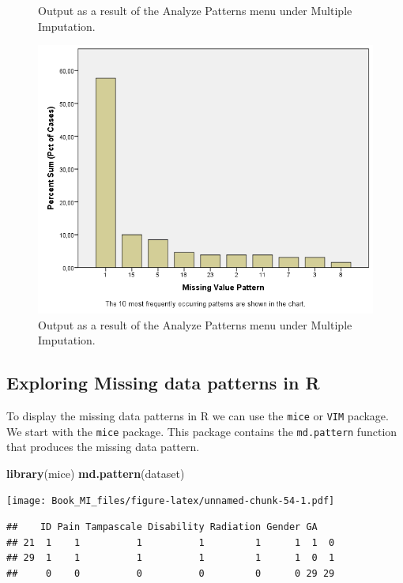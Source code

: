 \documentclass[]{book}
\newenvironment{Shaded}{\begin{snugshade}}{\end{snugshade}}
\newcommand{\KeywordTok}[1]{\textcolor[rgb]{0.13,0.29,0.53}{\textbf{#1}}}
\newcommand{\NormalTok}[1]{#1}
\begin{document}
\begin{figure}
{}

\caption{Output as a result of the Analyze Patterns menu under Multiple Imputation.}\label{fig:fig2-6}
\end{figure}\begin{figure}

{\centering \includegraphics[width=0.9\linewidth]{images/fig2.6d} 

}

\caption{Output as a result of the Analyze Patterns menu under Multiple Imputation.}\label{fig:fig2-6}
\end{figure}

\subsection{Exploring Missing data patterns in
R}\label{exploring-missing-data-patterns-in-r}

To display the missing data patterns in R we can use the \texttt{mice}
or \texttt{VIM} package. We start with the \texttt{mice} package. This
package contains the \texttt{md.pattern} function that produces the
missing data pattern.

\begin{Shaded}
\begin{Highlighting}[]
\KeywordTok{library}\NormalTok{(mice)}
\KeywordTok{md.pattern}\NormalTok{(dataset)}
\end{Highlighting}
\end{Shaded}

\texttt{[image: Book\_MI\_files/figure-latex/unnamed-chunk-54-1.pdf]}

\begin{verbatim}
##    ID Pain Tampascale Disability Radiation Gender GA   
## 21  1    1          1          1         1      1  1  0
## 29  1    1          1          1         1      1  0  1
##     0    0          0          0         0      0 29 29
\end{verbatim}
\end{document}
